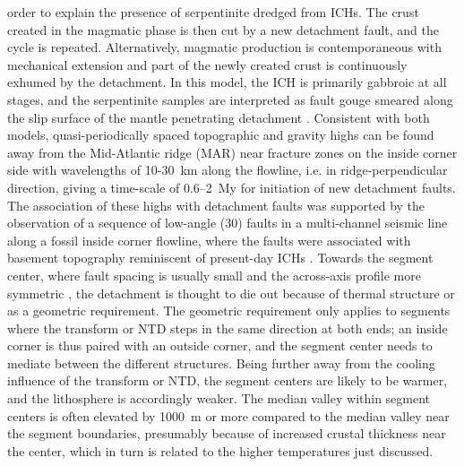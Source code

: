 \documentclass[jgr]{agu2001}
\newlength{\tw}
\begin{document}
\begin{article}
order to explain the presence of serpentinite dredged from ICHs. The crust 
created in the magmatic phase is then cut by a new detachment fault,
and the cycle is repeated.  Alternatively,
magmatic production is contemporaneous with mechanical extension and part
of the newly created crust is continuously exhumed by the
detachment. In this model, the ICH is primarily gabbroic at all
stages, and the serpentinite samples are interpreted as fault gouge
smeared along the slip surface of the mantle penetrating detachment \citep{reston02}.
Consistent with both models, quasi-periodically spaced topographic and
gravity highs can be
found away from the Mid-Atlantic ridge  (MAR) near fracture zones on the
inside corner side with wavelengths of 10-30~km along the flowline, i.e. in
ridge-perpendicular direction, giving a time-scale of 0.6--2~My for initiation of new detachment faults.  The
association of these highs with detachment faults was supported by the
observation of a sequence of low-angle (30\dg) faults in a multi-channel seismic
line along a fossil inside corner flowline, where the faults were
associated with basement topography reminiscent of
present-day ICHs \citep{ranero99}. 
Towards the segment center, where fault spacing is usually small and
the across-axis profile more symmetric \citep{shaw93}, the
detachment is thought to die out because of thermal structure or as a
geometric requirement.  The geometric requirement only applies to
segments where the transform or NTD steps in the same direction at
both ends; an inside corner is thus paired with an outside corner, and
the segment center needs to mediate between the different structures.
Being further away from the cooling influence of the transform or NTD,
the segment centers are likely to be warmer, and the lithosphere is
accordingly weaker.  The median valley within segment centers is often
elevated by 1000~m or more compared to the median valley near the
segment boundaries, presumably because of increased
crustal thickness near the center,
which in turn is related to the  higher temperatures just discussed.


\end{article}
\end{document}
